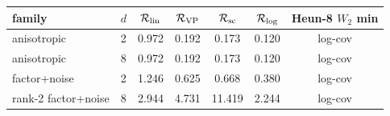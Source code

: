 \begin{tabular}{llccccc}
\toprule
family & $d$ & $\mathcal{R}_{\mathrm{lin}}$ & $\mathcal{R}_{\mathrm{VP}}$ & $\mathcal{R}_{\mathrm{sc}}$ & $\mathcal{R}_{\mathrm{log}}$ & Heun-8 $W_2$ min \\
\midrule
anisotropic & 2 & 0.972 & 0.192 & 0.173 & 0.120 & log-cov \\
anisotropic & 8 & 0.972 & 0.192 & 0.173 & 0.120 & log-cov \\
factor+noise & 2 & 1.246 & 0.625 & 0.668 & 0.380 & log-cov \\
rank-2 factor+noise & 8 & 2.944 & 4.731 & 11.419 & 2.244 & log-cov \\
\bottomrule
\end{tabular}
